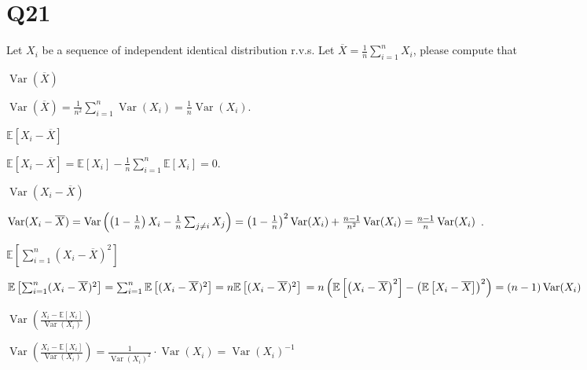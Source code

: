 \documentclass[11pt]{article}
\begin{document}
\section*{Q21}
Let $X_{i}$ be a sequence of independent identical distribution r.v.s.
Let $\overline{X}=\frac{1}{n}\sum_{i=1}^{n }X_{i}$, please compute that
\begin{qparts}
    
    \item $\operatorname{Var}(\overline{X})$
    \begin{solution}
        $\operatorname{Var}(\overline{X})=\frac{1}{n^{2}}\sum_{i=1}^{n }\operatorname{Var}(X_{i})=\frac{1}{n}\operatorname{Var}(X_{i})$.
    \end{solution}

    \item $\mathbb{E}\left[ X_{i}-\overline{X} \right] $
    \begin{solution}
        $\mathbb{E}\left[ X_{i}-\overline{X} \right] =
        \mathbb{E}\left[ X_{i} \right]-\frac{1}{n}\sum_{i=1}^{n }\mathbb{E}\left[ X_{i} \right] =0 $.
    \end{solution}


    \item $\operatorname{Var}(X_{i}-\overline{X})$
    \begin{solution}
        $\operatorname{Var}(X_{i}-\overline{X})=
        \operatorname{Var}\left( \left( 1-\frac{1}{n} \right)X_{i}- \frac{1}{n}\sum_{j\neq i}X_{j} \right)
        =\left( 1-\frac{1}{n} \right)^{2}\operatorname{Var}(X_{i})+\frac{n-1}{n^{2}}\operatorname{Var}(X_{i})\\=\frac{n-1}{n }\operatorname{Var}(X_{i})
        $ .
    \end{solution}

    \item $\mathbb{E}\left[ \sum_{i=1}^{n }(X_{i}-\overline{X})^{2} \right] $
    \begin{solution}
        $\mathbb{E}\left[ \sum_{i=1}^{n }(X_{i}-\overline{X})^{2} \right] 
        =\sum_{i=1}^{n}\mathbb{E}\left[ (X_{i}-\overline{X})^{2} \right]
        =n\mathbb{E}\left[ (X_{i}-\overline{X})^{2} \right]
        \\=n\left( \mathbb{E}\left[ \left( X_{i}-\overline{X} \right)^{2} \right]
        -\left( \mathbb{E}\left[ X_{i}-\overline{X} \right]  \right)^{2} \right)
        =(n-1)\operatorname{Var}(X_{i})$
    \end{solution}
    \item $\operatorname{Var}\left( \frac{X_{i}-\mathbb{E}\left[ X_{i} \right] }{\operatorname{Var}(X_{i})} \right)$
    \begin{solution}
        $\operatorname{Var}\left( \frac{X_{i}-\mathbb{E}\left[ X_{i} \right] }{\operatorname{Var}(X_{i})} \right)
        =\frac{1}{\operatorname{Var}(X_{i})^{2}}\cdot \operatorname{Var}(X_{i})=\operatorname{Var}(X_{i})^{-1}$
    \end{solution}
\end{qparts}
\end{document}
